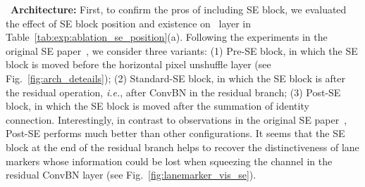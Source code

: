 \documentclass[10pt,twocolumn,letterpaper]{article}
\begin{document}
\ \textbf{Architecture:} First, to confirm the pros of including SE block, we evaluated the effect of SE block position and existence on \reductionname\ layer in Table~\ref{tab:exp:ablation_se_position}(a). Following the experiments in the original SE paper~\cite{SEBlock}, we consider three variants: (1) Pre-SE block, in which the SE block is moved before the horizontal pixel unshuffle layer (see Fig.~\ref{fig:arch_deteails}); 
(2) Standard-SE block, in which the SE block is after the residual operation, \textit{i.e.}, after ConvBN in the residual branch; (3) Post-SE block, in which the SE block is moved after the summation of identity connection. Interestingly, in contrast to observations in the original SE paper~\cite{SEBlock}, Post-SE performs much better than other configurations. It seems that the SE block at the end of the residual branch helps to recover the distinctiveness of lane markers whose information could be lost when squeezing the channel in the residual ConvBN layer (see Fig.~\ref{fig:lanemarker_vis_se}). 
\end{document}
